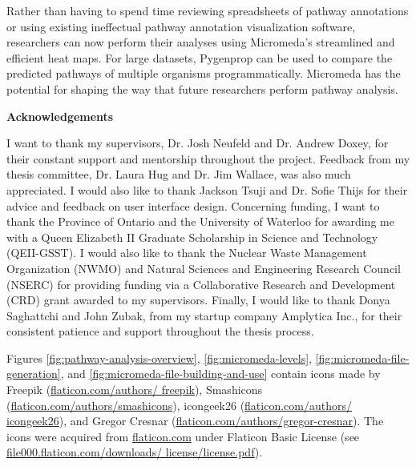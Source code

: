 Rather than having to spend time reviewing spreadsheets of pathway annotations 
or using existing ineffectual pathway annotation visualization software, 
researchers can now perform their analyses using Micromeda's streamlined and 
efficient heat maps. For large datasets, Pygenprop can be used to compare the 
predicted pathways of multiple organisms programmatically. Micromeda has the 
potential for shaping the way that future researchers perform pathway analysis.


\cleardoublepage


\begin{center}\textbf{Acknowledgements}\end{center}

I want to thank my supervisors, Dr. Josh Neufeld and Dr. Andrew Doxey, for their 
constant support and mentorship throughout the project. Feedback from my thesis 
committee, Dr. Laura Hug and Dr. Jim Wallace, was also much appreciated. I would 
also like to thank Jackson Tsuji and Dr. Sofie Thijs for their advice and 
feedback on user interface design. Concerning funding, I want to thank the 
Province of Ontario and the University of Waterloo for awarding me with a Queen 
Elizabeth II Graduate Scholarship in Science and Technology (QEII-GSST). I would 
also like to thank the Nuclear Waste Management Organization (NWMO) and Natural 
Sciences and Engineering Research Council (NSERC) for providing funding via a 
Collaborative Research and Development (CRD) grant awarded to my supervisors. 
Finally, I would like to thank Donya Saghattchi and John Zubak, from my startup 
company Amplytica Inc., for their consistent patience and support throughout the 
thesis process.

Figures \ref{fig:pathway-analysis-overview}, \ref{fig:micromeda-levels}, 
\ref{fig:micromeda-file-generation}, and 
\ref{fig:micromeda-file-building-and-use} contain icons made by Freepik 
(\href{http://flaticon.com/authors/freepik}{flaticon.com/authors/ freepik}), 
Smashicons 
(\href{http://flaticon.com/authors/smashicons}{flaticon.com/authors/smashicons}), 
icongeek26 (\href{http://flaticon.com/authors/icongeek26}{flaticon.com/authors/ 
icongeek26}), and Gregor Cresnar 
(\href{http://flaticon.com/authors/gregor-cresnar}{flaticon.com/authors/gregor-cresnar}). 
The icons were acquired from \href{http://flaticon.com}{flaticon.com} under 
Flaticon Basic License (see \href{http://file000.flaticon.com/downloads/license/ 
license.pdf}{file000.flaticon.com/downloads/ license/license.pdf}).

